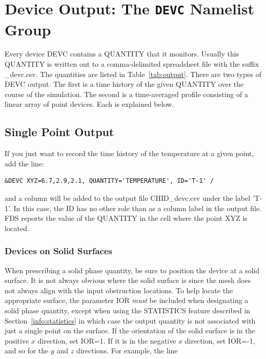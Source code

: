 \documentclass[11pt]{book}
\begin{document}
\section{Device Output: The \texorpdfstring{{\tt DEVC}}{DEVC} Namelist Group}

Every device {\ct DEVC} contains a {\ct QUANTITY} that it monitors. Usually this {\ct QUANTITY} is written out to a comma-delimited spreadsheet file with the suffix {\ct \_devc.csv}. The quantities are listed in Table~\ref{tab:output}. There are two types of {\ct DEVC} output. The first is a time history of the given {\ct QUANTITY} over the course of the simulation. The second is a time-averaged profile consisting of a linear array of point devices. Each is explained below.

\subsection{Single Point Output}

If you just want to record the time history of the temperature at a given point, add the line:

\begin{lstlisting}
&DEVC XYZ=6.7,2.9,2.1, QUANTITY='TEMPERATURE', ID='T-1' /
\end{lstlisting}

\noindent
and a column will be added to the output file {\ct CHID\_devc.csv} under the label {\ct 'T-1'}. In this case, the {\ct ID} has no other role than as a column label in the output file.
FDS reports the value of the {\ct QUANTITY} in the cell where the point {\ct XYZ} is located.

\subsubsection{Devices on Solid Surfaces}

When prescribing a solid phase quantity, be sure to position the
device at a solid surface. It is not always obvious where the
solid surface is since the mesh does not always align with the input obstruction
locations. To help locate the appropriate surface, the parameter {\ct IOR} {\em must} be included
when designating a solid phase quantity, except when using the {\ct STATISTICS} feature described in
Section~\ref{info:statistics} in which case the output quantity is not associated with just a single point
on the surface.
If the orientation of the solid surface is in the
positive $x$ direction, set {\ct IOR=1}. If it is in the negative $x$ direction, set {\ct IOR=-1}, and so for the $y$ and $z$ directions.
For example, the line
\end{document}
